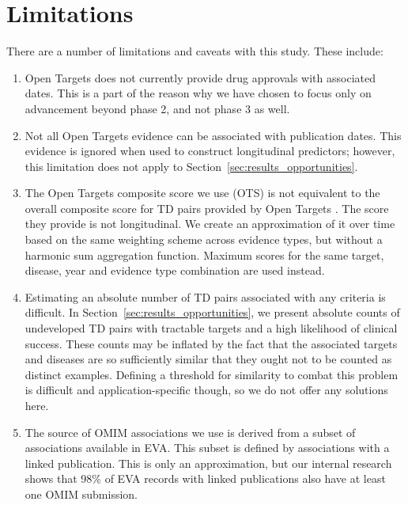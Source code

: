 \documentclass{article}
\begin{document}
\section{Limitations}
\label{sec:limitations}

There are a number of limitations and caveats with this study. These include:

\begin{enumerate}[topsep=0pt,itemsep=-1ex,partopsep=1ex,parsep=1ex]
  \item Open Targets does not currently provide drug approvals with associated dates. This is a part of the reason why we have chosen to focus only on advancement beyond phase 2, and not phase 3 as well. 
  \item Not all Open Targets evidence can be associated with publication dates. This evidence is ignored when used to construct longitudinal predictors; however, this limitation does not apply to Section~\ref{sec:results_opportunities}.
  \item The Open Targets composite score we use (OTS) is not equivalent to the overall composite score for TD pairs provided by Open Targets \cite{OTscoring}. The score they provide is not longitudinal. We create an approximation of it over time based on the same weighting scheme across evidence types, but without a harmonic sum aggregation function. Maximum scores for the same target, disease, year and evidence type combination are used instead.
  \item Estimating an absolute number of TD pairs associated with any criteria is difficult. In Section~\ref{sec:results_opportunities}, we present absolute counts of undeveloped TD pairs with tractable targets and a high likelihood of clinical success. These counts may be inflated by the fact that the associated targets and diseases are so sufficiently similar that they ought not to be counted as distinct examples. Defining a threshold for similarity to combat this problem is difficult and application-specific though, so we do not offer any solutions here.
  \item The source of OMIM associations we use is derived from a subset of associations available in EVA. This subset is defined by associations with a linked publication. This is only an approximation, but our internal research shows that 98\% of EVA records with linked publications also have at least one OMIM submission.
\end{enumerate}

\pagebreak
\end{document}
